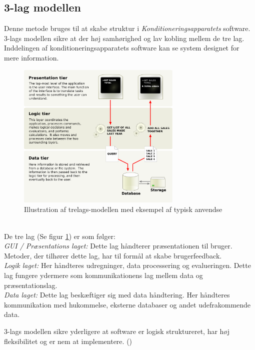 \subsection{3-lag modellen}
Denne metode bruges til at skabe struktur i \textit{Konditioneringsapparatets} software. 3-lags modellen sikre at der høj samhørighed og lav kobling mellem de tre lag. Inddelingen af konditioneringsapparatets software kan se system designet  for mere information. 
\begin{figure}[H]
	\centering
\includegraphics[width = 0.7\textwidth]{billeder/trelagsmodel.png}
\caption{Illustration af trelags-modellen med eksempel af typisk anvendse}\label{fig:3lagsmodel}
\end{figure}
\\
De tre lag (Se figur \ref{fig:3lagsmodel}) er som følger: \\
\textit{GUI / Præsentations laget:} Dette lag håndterer præsentationen til bruger. Metoder, der tilhører dette lag, har til formål at skabe brugerfeedback. \\
\textit{Logik laget: } Her håndteres udregninger, data processering og evalueringen. Dette lag fungere ydermere som kommunikationens lag mellem data og præsentationslag. 
\\ \textit{Data laget: } Dette lag beskæftiger sig med data håndtering. Her håndteres kommunikation med hukommelse, eksterne databaser og andet udefrakommende data.

3-lags modellen sikre yderligere at software er logisk struktureret, har høj fleksibilitet og er nem at implementere. (\cite{RefWorks:31})
